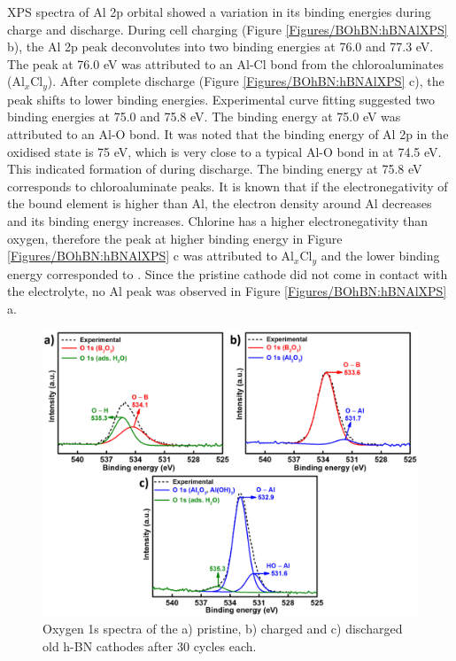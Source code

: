 XPS spectra of Al 2p orbital showed a variation in its binding energies during charge and discharge. During cell charging (Figure \ref{Figures/BOhBN:hBNAlXPS} b), the Al 2p peak deconvolutes into two binding energies at 76.0 and 77.3 eV. The peak at 76.0 eV was attributed to an Al-Cl bond from the chloroaluminates (Al$_{x}$Cl$_{y}$). After complete discharge (Figure \ref{Figures/BOhBN:hBNAlXPS} c), the peak shifts to lower binding energies. Experimental curve fitting suggested two binding energies at 75.0 and 75.8 eV. The binding energy at 75.0 eV was attributed to an Al-O bond. It was noted that the binding energy of Al 2p in the oxidised state is 75 eV, which is very close to a typical Al-O bond in  at 74.5 eV. This indicated formation of  during discharge. The binding energy at 75.8 eV corresponds to chloroaluminate peaks. It is known that if the electronegativity of the bound element is higher than Al, the electron density around Al decreases and its binding energy increases. Chlorine has a higher electronegativity than oxygen, therefore the peak at higher binding energy in Figure \ref{Figures/BOhBN:hBNAlXPS} c was attributed to Al$_{x}$Cl$_{y}$ and the lower binding energy corresponded to . Since the pristine cathode did not come in contact with the electrolyte, no Al peak was observed in Figure \ref{Figures/BOhBN:hBNAlXPS} a.

\begin{figure}[tbh!]
\centering
\includegraphics[width=\textwidth]{Figures/BOhBN/hBNOXPS}
\caption{Oxygen 1s spectra of the a) pristine, b) charged and c) discharged old h-BN cathodes after 30 cycles each.}
\label{Figures/BOhBN:hBNOXPS}
\end{figure}


